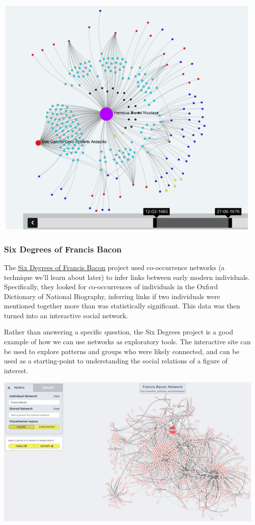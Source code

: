 \documentclass[
]{book}
\begin{document}
\includegraphics[width=5.20833in,height=\textheight]{images/Screenshot 2022-10-03 at 11.23.15.png}

\hypertarget{six-degrees-of-francis-bacon}{%
\subsubsection{Six Degrees of Francis Bacon}\label{six-degrees-of-francis-bacon}}

The \href{http://www.sixdegreesoffrancisbacon.com/}{Six Degrees of Francis Bacon} project used co-occurrence networks (a technique we'll learn about later) to infer links between early modern individuals. Specifically, they looked for co-occurrences of individuals in the Oxford Dictionary of National Biography, inferring links if two individuals were mentioned together more than was statistically significant. This data was then turned into an interactive social network.

Rather than answering a specific question, the Six Degrees project is a good example of how we can use networks as exploratory tools. The interactive site can be used to explore patterns and groups who were likely connected, and can be used as a starting-point to understanding the social relations of a figure of interest.

\includegraphics[width=6.25in,height=\textheight]{images/Screenshot 2022-10-03 at 11.26.54.png}
\end{document}
